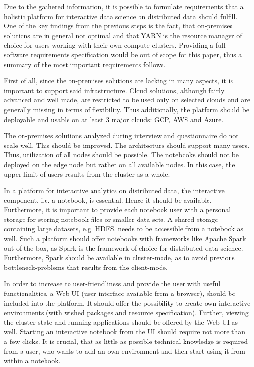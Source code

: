 \documentclass[a4paper,twoside]{article}
\begin{document}
Due to the gathered information, it is possible to formulate requirements that a holistic platform for interactive data science on distributed data should fulfill. One of the key findings from the previous steps is the fact, that on-premises solutions are in general not
optimal and that YARN is the resource manager of choice for users working with their own compute clusters. Providing a full software requirements specification would be out of scope for this paper, thus a summary of the most important requirements follows. 

First of all, since the on-premises solutions are lacking in many aspects, it is important to support said infrastructure. Cloud solutions, although fairly advanced and well made, are restricted to be used only on selected clouds and are generally missing in terms of flexibility. Thus additionally, the platform should be deployable and usable on at least 3 major clouds: GCP, AWS and Azure.

The on-premises solutions analyzed during interview and questionnaire do not scale well. This should be improved. The architecture should support many users. Thus, utilization of all nodes should be
possible. The notebooks should not be deployed on the edge node but rather on all available nodes. In this case, the upper limit of users results from the cluster as a whole.


In a platform for interactive analytics on distributed data, the interactive component, i.e. a notebook, is essential. Hence it should be available. Furthermore, it is important to provide each notebook user with a personal storage for storing notebook files or smaller data sets. A shared storage containing large datasets, e.g. HDFS, needs to be accessible from a notebook as well. Such a platform should offer notebooks with frameworks like Apache Spark out-of-the-box, as Spark is the framework of choice for distributed data science. Furthermore, Spark should be available in cluster-mode, as to avoid previous bottleneck-problems that results from the client-mode.

In order to increase to user-friendliness and provide the user with useful functionalities, a Web-UI (user interface available from a browser), should be included into the platform. It should offer the possibility to create own interactive environments (with wished packages and resource specification). Further, viewing the cluster state and running applications should be offered by the Web-UI as well. Starting an interactive notebook from the UI should require not more than a few clicks. It is crucial, that as little as possible technical knowledge is required from a user, who wants to add an own environment and then start using it from within a notebook.
\end{document}
